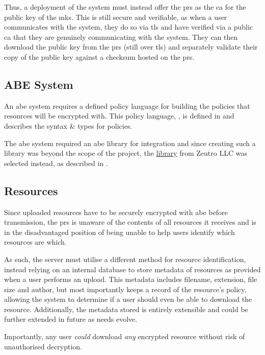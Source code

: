 Thus, a deployment of the \theResServer system must instead offer the \acrfull{prs} as the \acrfull{ca} for the public key of the \acrfull{mks}. This is still secure and verifiable, as when a user communicates with the \theResServer system, they do so via \acrshort{tls} and have verified via a public \acrshort{ca} that they are genuinely communicating with the \theResServer system. They can then download the public key from the \acrshort{prs} (still over \acrshort{tls}) and separately validate their copy of the public key against a checksum hosted on the \acrshort{prs}.

\subsection{ABE System}
\label{subsec:design_abe_sys}

An \acrfull{abe} system requires a defined policy language for building the policies that resources will be encrypted with. This policy language, \thePolicyLang, is defined in  and describes the syntax \& types for policies.

The \acrshort{abe} system required an \acrshort{abe} library for integration and since creating such a library was beyond the scope of the project, the \href{https://github.com/zeutro/openabe}{\OpenABE library} from Zeutro LLC was selected instead, as described in .

\subsection{Resources}
\label{subsec:design_resources}

Since uploaded resources have to be securely encrypted with \acrshort{abe} before transmission, the \acrfull{prs} is unaware of the contents of all resources it receives and is in the disadvantaged position of being unable to help users identify which resources are which.

As such, the server must utilise a different method for resource identification, instead relying on an internal database to store metadata of resources as provided when a user performs an upload. This metadata includes filename, extension, file size and author, but most importantly keeps a record of the resource's policy, allowing the system to determine if a user should even be able to download the resource. Additionally, the metadata stored is entirely extensible and could be further extended in future as needs evolve.

Importantly, any user \textit{could} download \textit{any} encrypted resource without risk of unauthorised decryption.

